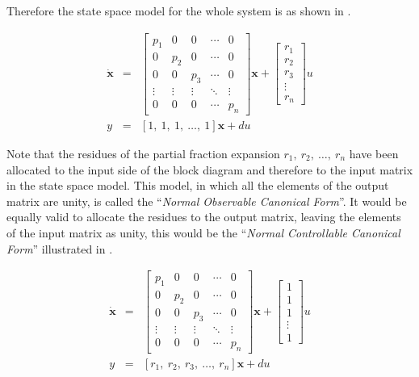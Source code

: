 Therefore the state space model for the whole system is as shown
in .
\begin{slide}\label{slide:l6s3}
\begin{eqnarray*} \mathbf{\dot{x}}&=&\left[\begin{array}{ccccc}
  p_1 & 0 & 0 & \cdots & 0 \\
  0 & p_2 & 0 & \cdots & 0 \\
  0 & 0 & p_3 & \cdots & 0 \\
  \vdots & \vdots & \vdots & \ddots & \vdots \\
  0 & 0 & 0 & \cdots & p_n
\end{array}\right] \mathbf{x} + \left[\begin{array}{c}
  r_1 \\
  r_2 \\
  r_3 \\
  \vdots \\
  r_n
\end{array}\right] u\\ y &=& \left[1,\ 1,\ 1,\ \ldots,\ 1\right] \mathbf{x} + d u
\end{eqnarray*}
 \end{slide}

Note that the residues of the partial fraction expansion $r_1,\
r_2,\ \ldots,\ r_n$ have been allocated to the input side of the
block diagram and therefore to the input matrix in the state space
model. This model, in which all the elements of the output matrix
are unity, is called the ``\emph{Normal Observable Canonical
Form}''. It would be equally valid to allocate the residues to the
output matrix, leaving the elements of the input matrix as unity,
this would be the ``\emph{Normal Controllable Canonical Form}''
illustrated in .

\begin{slide}\label{slide:l6s3b}
\begin{eqnarray*} \mathbf{\dot{x}}&=&\left[\begin{array}{ccccc}
  p_1 & 0 & 0 & \cdots & 0 \\
  0 & p_2 & 0 & \cdots & 0 \\
  0 & 0 & p_3 & \cdots & 0 \\
  \vdots & \vdots & \vdots & \ddots & \vdots \\
  0 & 0 & 0 & \cdots & p_n
\end{array}\right] \mathbf{x} + \left[\begin{array}{c}
  1 \\
  1 \\
  1 \\
  \vdots \\
  1
\end{array}\right] u\\ y &=& \left[r_1,\ r_2,\ r_3,\ \ldots,\ r_n\right] \mathbf{x} + d u
\end{eqnarray*}
 \end{slide}

